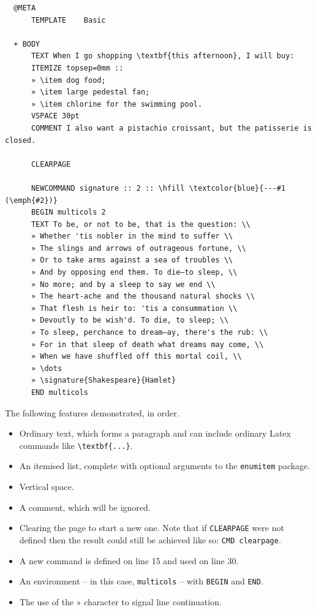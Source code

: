 \documentclass[11pt]{article}
\begin{document}
\begin{verbatim}
  @META
      TEMPLATE    Basic

  + BODY
      TEXT When I go shopping \textbf{this afternoon}, I will buy:
      ITEMIZE topsep=0mm ::
      » \item dog food;
      » \item large pedestal fan;
      » \item chlorine for the swimming pool.
      VSPACE 30pt
      COMMENT I also want a pistachio croissant, but the patisserie is closed.

      CLEARPAGE

      NEWCOMMAND signature :: 2 :: \hfill \textcolor{blue}{---#1 (\emph{#2})}
      BEGIN multicols 2
      TEXT To be, or not to be, that is the question: \\
      » Whether 'tis nobler in the mind to suffer \\
      » The slings and arrows of outrageous fortune, \\
      » Or to take arms against a sea of troubles \\
      » And by opposing end them. To die—to sleep, \\
      » No more; and by a sleep to say we end \\
      » The heart-ache and the thousand natural shocks \\
      » That flesh is heir to: 'tis a consummation \\
      » Devoutly to be wish'd. To die, to sleep; \\
      » To sleep, perchance to dream—ay, there's the rub: \\
      » For in that sleep of death what dreams may come, \\
      » When we have shuffled off this mortal coil, \\
      » \dots
      » \signature{Shakespeare}{Hamlet}
      END multicols
\end{verbatim}

The following features demonstrated, in order.
\begin{itemize}
  \item Ordinary text, which forms a paragraph and can include ordinary Latex commands like \verb|\textbf{...}|.
  \item An itemised list, complete with optional arguments to the \texttt{enumitem} package.
  \item Vertical space.
  \item A comment, which will be ignored.
  \item Clearing the page to start a new one. Note that if \texttt{CLEARPAGE} were not defined then the result could still be achieved like so: \texttt{CMD clearpage}.
  \item A new command is defined on line 15 and used on line 30.
  \item An environment -- in this case, \texttt{multicols} -- with \texttt{BEGIN} and \texttt{END}.
  \item The use of the » character to signal line continuation.
\end{itemize}
\end{document}
